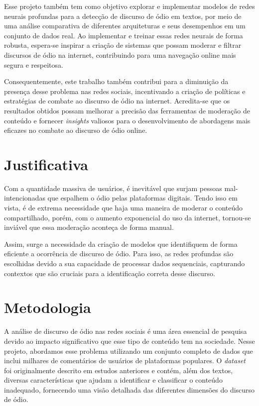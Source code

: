 \documentclass[conference]{IEEEtran}
\begin{document}
Esse projeto também tem como objetivo explorar e implementar modelos de redes neurais profundas para a detecção de discurso de ódio em textos, por meio de uma análise comparativa de diferentes arquiteturas e seus desempenhos em um conjunto de dados real. Ao implementar e treinar essas redes neurais de forma robusta, espera-se inspirar a criação de sistemas que possam moderar e filtrar discursos de ódio na internet, contribuindo para uma navegação online mais segura e respeitosa.

Consequentemente, este trabalho também contribui para a diminuição da presença desse problema nas redes sociais, incentivando a criação de políticas e estratégias de combate ao discurso de ódio na internet. Acredita-se que os resultados obtidos possam melhorar a precisão das ferramentas de moderação de conteúdo e fornecer \textit{insights} valiosos para o desenvolvimento de abordagens mais eficazes no combate ao discurso de ódio online.

\section{Justificativa}

Com a quantidade massiva de usuários, é inevitável que surjam pessoas mal-intencionadas que espalhem o ódio pelas plataformas digitais. Tendo isso em vista, é de extrema necessidade que haja uma maneira de moderar o conteúdo compartilhado, porém, com o aumento exponencial do uso da internet, tornou-se inviável que essa moderação aconteça de forma manual.

Assim, surge a necessidade da criação de modelos que identifiquem de forma eficiente a ocorrência de discurso de ódio. Para isso, as redes profundas são escolhidas devido a sua capacidade de processar dados sequenciais, capturando contextos que são cruciais para a identificação correta desse discurso.

\section{Metodologia}
A análise de discurso de ódio nas redes sociais é uma área essencial de pesquisa devido ao impacto significativo que esse tipo de conteúdo tem na sociedade. Nesse projeto, abordamos esse problema utilizando um conjunto completo de dados que inclui milhares de comentários de usuários de plataformas populares. O \textit{dataset} foi originalmente descrito em estudos anteriores e contém, além dos textos, diversas características que ajudam a identificar e classificar o conteúdo inadequado, fornecendo uma visão detalhada das diferentes dimensões do discurso de ódio.
\end{document}
